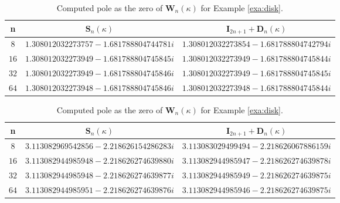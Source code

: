 \documentclass{article}
\renewcommand{\vec}[1]{\boldsymbol{#1}}
\renewcommand{\vec}[1]{\boldsymbol{#1}}
\begin{document}
	
	\begin{center}
		\begin{table}[ht]
			\caption{Computed pole as the zero of $\vec{W}_n(\kappa)$ for Example \ref{exa:disk}. }
			\label{Disc1}
			\begin{center}
				\small
				\begin{tabular}{c|c|c}
					\hline
					n	&   $\vec{S}_n(\kappa)$ &  $\vec{I}_{2n+1}+\vec{D}_n(\kappa)$\\
					\hline
					$8$ & $1.308012032273757-1.681788804744781i$& $1.308012032273854 - 1.681788804742794i$\\
					\hline
					$16$ & $1.308012032273949 - 1.681788804745845i$& $1.308012032273949 - 1.681788804745844i$ \\
					\hline
					$32$ & $1.308012032273949 - 1.681788804745846i$&$1.308012032273949 - 1.681788804745845i$ \\
					\hline
					$64$ & $1.308012032273948 - 1.681788804745846i$& $1.308012032273948 - 1.681788804745844i$\\
					\hline
				\end{tabular}
			\end{center}
		\end{table}
	\end{center}
	
	\begin{center}
		\begin{table}[h!]
			\caption{Computed pole as the zero of $\vec{W}_n(\kappa)$ for Example \ref{exa:disk}. }
			\label{Disc2}
			\begin{center}
				\small
				\begin{tabular}{c|c|c}
					\hline
					n	&   $\vec{S}_n(\kappa)$ &  $\vec{I}_{2n+1}+\vec{D}_n(\kappa)$\\
					\hline
					$8$ & $3.113082969542856 - 2.218626154286283i$& $3.113083029499494 - 2.218626067886159i$\\
					\hline
					$16$ & $3.113082944985948 - 2.218626274639880i$& $ 3.113082944985947 - 2.218626274639878i$ \\
					\hline
					$32$ & $3.113082944985948 - 2.218626274639877i$&$3.113082944985949 - 2.218626274639875i$ \\
					\hline
					$64$ & $3.113082944985951 - 2.218626274639876i$& $3.113082944985946 - 2.218626274639875i$\\
					\hline
				\end{tabular}
			\end{center}
		\end{table}
	\end{center}
	
\end{document}
